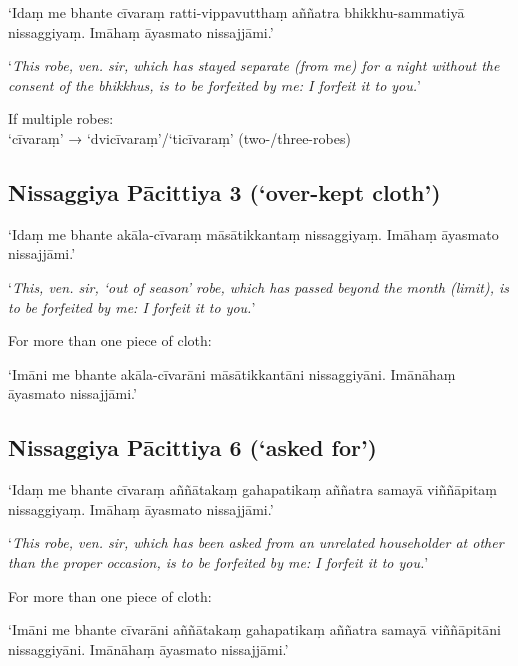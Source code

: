 ‘Idaṃ me bhante cīvaraṃ ratti-vippavutthaṃ aññatra bhikkhu-sammatiyā
nissaggiyaṃ. Imāhaṃ āyasmato nissajjāmi.’

‘\emph{This robe, ven. sir, which has stayed separate (from me) for a night
  without the consent of the bhikkhus, is to be forfeited by me: I forfeit it to
  you.}’ 

If multiple robes:\\
‘cīvaraṃ’ → ‘dvicīvaraṃ’/‘ticīvaraṃ’ (two-/three-robes)

 
\subsection[NP 3 (‘over-kept cloth’)]{Nissaggiya Pācittiya 3 (‘over-kept cloth’)}

‘Idaṃ me bhante akāla-cīvaraṃ māsātikkantaṃ nissaggiyaṃ. Imāhaṃ āyasmato nissajjāmi.’

‘\emph{This, ven. sir, ‘out of season’ robe, which has passed beyond the month
  (limit), is to be forfeited by me: I forfeit it to you.}’ 

For more than one piece of cloth:

‘Imāni me bhante akāla-cīvarāni māsātikkantāni nissaggiyāni. Imānāhaṃ āyasmato nissajjāmi.’


\subsection[NP 6 (‘asked for’)]{Nissaggiya Pācittiya 6 (‘asked for’)}

‘Idaṃ me bhante cīvaraṃ aññātakaṃ gahapatikaṃ aññatra samayā viññāpitaṃ
nissaggiyaṃ. Imāhaṃ āyasmato nissajjāmi.’

‘\emph{This robe, ven. sir, which has been asked from an unrelated householder at
  other than the proper occasion, is to be forfeited by me: I forfeit it to you.}’

For more than one piece of cloth:

‘Imāni me bhante cīvarāni aññātakaṃ gahapatikaṃ aññatra samayā viññāpitāni
nissaggiyāni. Imānāhaṃ āyasmato nissajjāmi.’

